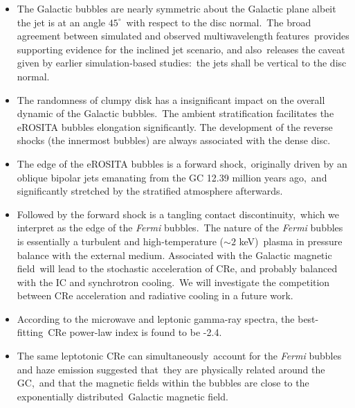 \documentclass[twocolumn]{aastex631}
\begin{document}
\begin{itemize}

\item The Galactic bubbles are nearly symmetric about the Galactic plane albeit the jet is at an angle $45^{\circ}$\
      with respect to the disc normal.\
      The broad agreement between simulated and observed multiwavelength features\
      provides supporting evidence for the inclined jet scenario, and also\
      releases the caveat given by earlier simulation-based studies:\
      the jets shall be vertical to the disc normal.
\item The randomness of clumpy disk has a insignificant impact on the overall dynamic of the Galactic bubbles.\
      The ambient stratification facilitates the eROSITA bubbles elongation significantly.
      The development of the reverse shocks (the innermost bubbles) are always associated with the dense disc.
\item The edge of the eROSITA bubbles is a forward shock,\
      originally driven by an oblique bipolar jets emanating from the GC 12.39 million years ago,\
      and significantly stretched by the stratified atmosphere afterwards.
\item Followed by the forward shock is a tangling contact discontinuity,\
      which we interpret as the edge of the \textit{Fermi} bubbles.\
      The nature of the \textit{Fermi} bubbles is essentially a turbulent and high-temperature ($\sim2$ keV)\
      plasma in pressure balance with the external medium. Associated with the Galactic magnetic field\
      will lead to the stochastic acceleration of CRe, and probably balanced with the IC and synchrotron cooling.\
      We will investigate the competition between CRe acceleration and radiative cooling in a future work.
\item According to the microwave and leptonic gamma-ray spectra, the best-fitting\
      CRe power-law index is found to be -2.4.
\item The same leptotonic CRe can simultaneously\
      account for the \textit{Fermi} bubbles and haze emission suggested that\
      they are physically related around the GC,\
      and that the magnetic fields within the bubbles are close to the exponentially distributed\
      Galactic magnetic field.
\end{itemize}



%
%
\end{document}
